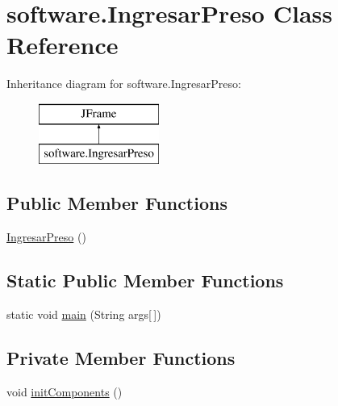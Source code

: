 \hypertarget{classsoftware_1_1_ingresar_preso}{}\section{software.\+Ingresar\+Preso Class Reference}
\label{classsoftware_1_1_ingresar_preso}
Inheritance diagram for software.\+Ingresar\+Preso\+:\begin{figure}[H]
\begin{center}
\leavevmode
\includegraphics[height=2.000000cm]{classsoftware_1_1_ingresar_preso}
\end{center}
\end{figure}
\subsection*{Public Member Functions}
\begin{DoxyCompactItemize}
\item 
\mbox{\hyperlink{classsoftware_1_1_ingresar_preso_a565b73716f68bd3fa7126be93b8cb60b}{Ingresar\+Preso}} ()
\end{DoxyCompactItemize}
\subsection*{Static Public Member Functions}
\begin{DoxyCompactItemize}
\item 
static void \mbox{\hyperlink{classsoftware_1_1_ingresar_preso_a9ead7a0bf8ad05ff0726a2d7892147a2}{main}} (String args\mbox{[}$\,$\mbox{]})
\end{DoxyCompactItemize}
\subsection*{Private Member Functions}
\begin{DoxyCompactItemize}
\item 
void \mbox{\hyperlink{classsoftware_1_1_ingresar_preso_a0c56fe65b6f37cd014a9b9c19ce479b7}{init\+Components}} ()
\end{DoxyCompactItemize}
